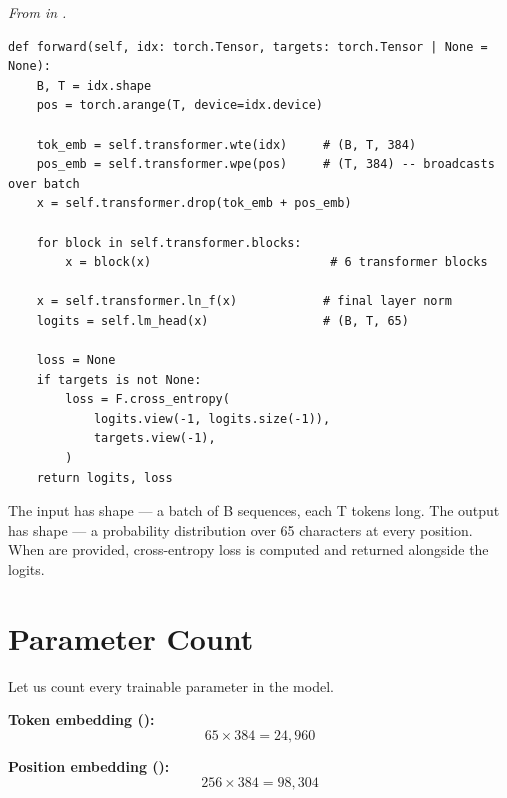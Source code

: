 \concepttag
{\small\itshape From  in .}
\begin{lstlisting}
def forward(self, idx: torch.Tensor, targets: torch.Tensor | None = None):
    B, T = idx.shape
    pos = torch.arange(T, device=idx.device)

    tok_emb = self.transformer.wte(idx)     # (B, T, 384)
    pos_emb = self.transformer.wpe(pos)     # (T, 384) -- broadcasts over batch
    x = self.transformer.drop(tok_emb + pos_emb)

    for block in self.transformer.blocks:
        x = block(x)                         # 6 transformer blocks

    x = self.transformer.ln_f(x)            # final layer norm
    logits = self.lm_head(x)                # (B, T, 65)

    loss = None
    if targets is not None:
        loss = F.cross_entropy(
            logits.view(-1, logits.size(-1)),
            targets.view(-1),
        )
    return logits, loss
\end{lstlisting}

The input  has shape  --- a batch of B sequences, each T tokens long. The output  has shape  --- a probability distribution over 65 characters at every position. When  are provided, cross-entropy loss is computed and returned alongside the logits.


\section{Parameter Count}

Let us count every trainable parameter in the model.

\textbf{Token embedding ():}
\[65 \times 384 = 24{,}960\]

\textbf{Position embedding ():}
\[256 \times 384 = 98{,}304\]

